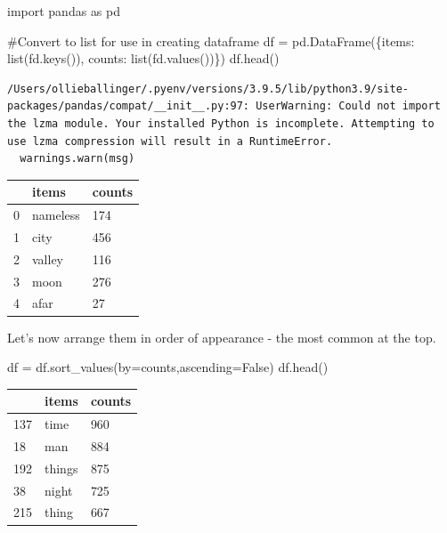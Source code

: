 \documentclass[
  letterpaper,
  DIV=11,
  numbers=noendperiod]{scrreprt}
\newenvironment{Shaded}{\begin{snugshade}}{\end{snugshade}}
\newcommand{\BuiltInTok}[1]{\textcolor[rgb]{0.00,0.23,0.31}{#1}}
\newcommand{\CommentTok}[1]{\textcolor[rgb]{0.37,0.37,0.37}{#1}}
\newcommand{\ImportTok}[1]{\textcolor[rgb]{0.00,0.46,0.62}{#1}}
\newcommand{\NormalTok}[1]{\textcolor[rgb]{0.00,0.23,0.31}{#1}}
\newcommand{\OperatorTok}[1]{\textcolor[rgb]{0.37,0.37,0.37}{#1}}
\newcommand{\StringTok}[1]{\textcolor[rgb]{0.13,0.47,0.30}{#1}}
\newcommand{\VariableTok}[1]{\textcolor[rgb]{0.07,0.07,0.07}{#1}}
\begin{document}
\begin{Shaded}
\begin{Highlighting}[]
\ImportTok{import}\NormalTok{ pandas }\ImportTok{as}\NormalTok{ pd}

\CommentTok{\#Convert to list for use in creating dataframe}
\NormalTok{df }\OperatorTok{=}\NormalTok{ pd.DataFrame(\{}\StringTok{\textquotesingle{}items\textquotesingle{}}\NormalTok{: }\BuiltInTok{list}\NormalTok{(fd.keys()), }\StringTok{\textquotesingle{}counts\textquotesingle{}}\NormalTok{: }\BuiltInTok{list}\NormalTok{(fd.values())\})}
\NormalTok{df.head()}
\end{Highlighting}
\end{Shaded}

\begin{verbatim}
/Users/ollieballinger/.pyenv/versions/3.9.5/lib/python3.9/site-packages/pandas/compat/__init__.py:97: UserWarning: Could not import the lzma module. Your installed Python is incomplete. Attempting to use lzma compression will result in a RuntimeError.
  warnings.warn(msg)
\end{verbatim}

\begin{longtable}[]{@{}lll@{}}
\toprule()
& items & counts \\
\midrule()
\endhead
0 & nameless & 174 \\
1 & city & 456 \\
2 & valley & 116 \\
3 & moon & 276 \\
4 & afar & 27 \\
\bottomrule()
\end{longtable}

Let's now arrange them in order of appearance - the most common at the
top.

\begin{Shaded}
\begin{Highlighting}[]
\NormalTok{df }\OperatorTok{=}\NormalTok{ df.sort\_values(by}\OperatorTok{=}\StringTok{\textquotesingle{}counts\textquotesingle{}}\NormalTok{,ascending}\OperatorTok{=}\VariableTok{False}\NormalTok{)}
\NormalTok{df.head()}
\end{Highlighting}
\end{Shaded}

\begin{longtable}[]{@{}lll@{}}
\toprule()
& items & counts \\
\midrule()
\endhead
137 & time & 960 \\
18 & man & 884 \\
192 & things & 875 \\
38 & night & 725 \\
215 & thing & 667 \\
\bottomrule()
\end{longtable}
\end{document}
